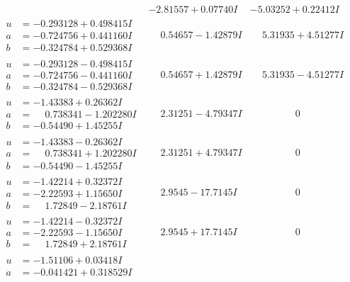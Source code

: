 \documentclass[1p]{elsarticle_modified}
\theoremstyle{definition}
\begin{document}
$$\begin{array}{c|c|c}
 & -2.81557 + 0.07740 I & -5.03252 + 0.22412 I \\ \hline\begin{aligned}
u &= -0.293128 + 0.498415 I \\
a &= -0.724756 + 0.441160 I \\
b &= -0.324784 + 0.529368 I\end{aligned}
 & \phantom{-}0.54657 - 1.42879 I & \phantom{-}5.31935 + 4.51277 I \\ \hline\begin{aligned}
u &= -0.293128 - 0.498415 I \\
a &= -0.724756 - 0.441160 I \\
b &= -0.324784 - 0.529368 I\end{aligned}
 & \phantom{-}0.54657 + 1.42879 I & \phantom{-}5.31935 - 4.51277 I \\ \hline\begin{aligned}
u &= -1.43383 + 0.26362 I \\
a &= \phantom{-}0.738341 - 1.202280 I \\
b &= -0.54490 + 1.45255 I\end{aligned}
 & \phantom{-}2.31251 - 4.79347 I & \phantom{-0.000000 } 0 \\ \hline\begin{aligned}
u &= -1.43383 - 0.26362 I \\
a &= \phantom{-}0.738341 + 1.202280 I \\
b &= -0.54490 - 1.45255 I\end{aligned}
 & \phantom{-}2.31251 + 4.79347 I & \phantom{-0.000000 } 0 \\ \hline\begin{aligned}
u &= -1.42214 + 0.32372 I \\
a &= -2.22593 + 1.15650 I \\
b &= \phantom{-}1.72849 - 2.18761 I\end{aligned}
 & \phantom{-}2.9545 - 17.7145 I & \phantom{-0.000000 } 0 \\ \hline\begin{aligned}
u &= -1.42214 - 0.32372 I \\
a &= -2.22593 - 1.15650 I \\
b &= \phantom{-}1.72849 + 2.18761 I\end{aligned}
 & \phantom{-}2.9545 + 17.7145 I & \phantom{-0.000000 } 0 \\ \hline\begin{aligned}
u &= -1.51106 + 0.03418 I \\
a &= -0.041421 + 0.318529 I \\

\end{aligned}
\end{array}$$
\end{document}
